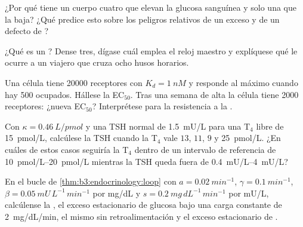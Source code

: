 \begin{exercise}[$\star$]\label{exo:b3:endocrinology:3}
¿Por qué tiene un cuerpo cuatro  que elevan la glucosa
sanguínea y solo una que la baja? ¿Qué predice esto sobre los peligros
relativos de un exceso y de un defecto de ?
\end{exercise}

\begin{exercise}[$\star$]\label{exo:b3:endocrinology:4}
¿Qué es un ? Dense tres, dígase cuál emplea el reloj maestro y
explíquese qué le ocurre a un viajero que cruza ocho husos horarios.
\end{exercise}

\begin{exercise}[$\star\star$]\label{exo:b3:endocrinology:5}
Una célula tiene \num{20000} receptores con $K_{d} = \qty{1}{nM}$ y
responde al máximo cuando hay \num{500} ocupados. Hállese la
EC$_{50}$. Tras una semana de  alta la célula tiene \num{2000}
receptores: ¿nueva EC$_{50}$? Interprétese para la resistencia a la
.
\end{exercise}

\begin{exercise}[$\star\star$]\label{exo:b3:endocrinology:6}
Con $\kappa = \qty{0.46}{L/pmol}$ y una TSH normal de \qty{1.5}{mU/L}
para una T$_{4}$ libre de \qty{15}{pmol/L}, calcúlese la TSH cuando la
T$_{4}$ vale $13$, $11$, $9$ y \qty{25}{pmol/L}. ¿En cuáles de estos
casos seguiría la T$_{4}$ dentro de un intervalo de referencia de
\qtyrange{10}{20}{pmol/L} mientras la TSH queda fuera de
\qtyrange{0.4}{4}{mU/L}?
\end{exercise}

\begin{exercise}[$\star\star$]\label{exo:b3:endocrinology:7}
En el bucle de \cref{thm:b3:endocrinology:loop} con $a = \qty{0.02}{min^{-1}}$,
$\gamma = \qty{0.1}{min^{-1}}$, $\beta = \qty{0.05}{mU\,L^{-1}\,min^{-1}}$
por mg/dL y $s = \qty{0.2}{mg\,dL^{-1}\,min^{-1}}$ por mU/L, calcúlense
la , el exceso estacionario de glucosa bajo una carga
constante de \qty{2}{mg/dL/min}, el mismo sin retroalimentación y el
exceso estacionario de .
\end{exercise}

